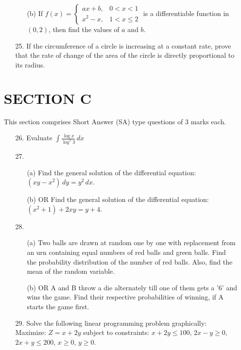 \documentclass{article}
\begin{document}
\begin{enumerate}
\begin{enumerate}
\begin{enumerate}
\item[(b)] If $f(x) =
\begin{cases}
ax + b, & 0 < x < 1 \\
x^2 - x, & 1 < x \leq 2
\end{cases}$ is a differentiable function in $(0, 2)$, then find the values of $a$ and $b$.
\end{enumerate}

\item[25.] If the circumference of a circle is increasing at a constant rate, prove that the rate of change of the area of the circle is directly proportional to its radius.

\end{enumerate}
\section*{SECTION C}

\noindent This section comprises Short Answer (SA) type questions of 3 marks each.

\begin{enumerate}
\item[26.] Evaluate $\int \frac{\log x}{\log^2 3} \, dx$

\item[27.]
\begin{enumerate}
\item[(a)] Find the general solution of the differential equation: $(xy - x^2) \, dy = y^2 \, dx$.

\item[(b)] OR Find the general solution of the differential equation: $(x^2 + 1) + 2xy = y + 4$.
\end{enumerate}

\item[28.]
\begin{enumerate}
\item[(a)] Two balls are drawn at random one by one with replacement from an urn containing equal numbers of red balls and green balls. Find the probability distribution of the number of red balls. Also, find the mean of the random variable.

\item[(b)] OR A and B throw a die alternately till one of them gets a '6' and wins the game. Find their respective probabilities of winning, if A starts the game first.
\end{enumerate}

\item[29.] Solve the following linear programming problem graphically: Maximize: $Z = x + 2y$ subject to constraints: $x + 2y \leq 100$, $2x - y \geq 0$, $2x + y \leq 200$, $x \geq 0$, $y \geq 0$.


\end{enumerate}
\end{enumerate}
\end{document}
